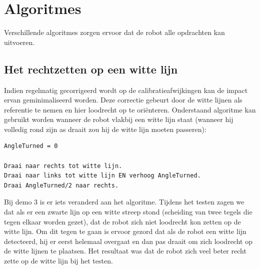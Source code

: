\documentclass[tt3]{penoverslag}
\begin{document}
\section{Algoritmes} %
\label{sec:algo}
Verschillende algoritmes zorgen ervoor dat de robot alle opdrachten kan uitvoeren.

%


\subsection{Het rechtzetten op een witte lijn} %
\label{ssec:algoWitteL}
Indien regelmatig gecorrigeerd wordt op de calibratieafwijkingen kan de impact ervan geminimaliseerd worden. Deze correctie gebeurt door de witte lijnen als referentie te nemen en hier loodrecht op te ori\"enteren.
Onderstaand algoritme kan gebruikt worden wanneer de robot vlakbij een witte lijn staat (wanneer hij volledig rond zijn as draait zou hij de witte lijn moeten passeren):

\lstset{frame=single, caption=Witte Lijn algoritme (pseudocode),
		label=code:algoWitteL, numbers=left, numberstyle=\footnotesize,
		basicstyle=\sffamily, numbersep=5pt}
\begin{lstlisting}
AngleTurned = 0

Draai naar rechts tot witte lijn.
Draai naar links tot witte lijn EN verhoog AngleTurned.
Draai AngleTurned/2 naar rechts.
\end{lstlisting}

Bij demo 3 is er iets veranderd aan het algoritme. Tijdens het testen zagen we dat als er een zwarte lijn op een witte streep stond (scheiding van twee tegels die tegen elkaar worden gezet), dat de robot zich niet loodrecht kon zetten op de witte lijn. Om dit tegen te gaan is ervoor gezord dat als de robot een witte lijn detecteerd, hij er eerst helemaal overgaat en dan pas draait om zich loodrecht op de witte lijnen te plaatsen. Het resultaat was dat de robot zich veel beter recht zette op de witte lijn bij het testen.\\
\end{document}
